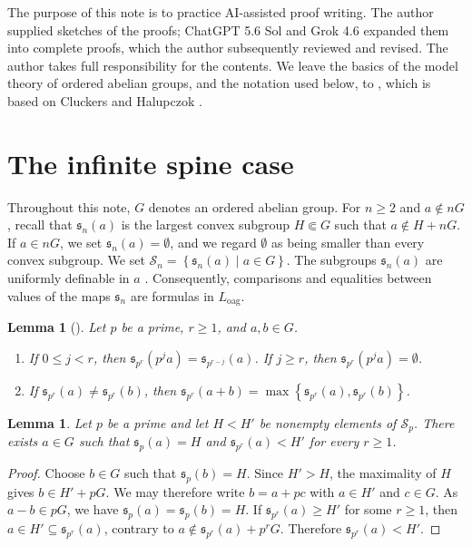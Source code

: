 \documentclass{article}
\theoremstyle{definition}
\theoremstyle{remark}
\theoremstyle{plain}
\newtheorem{lem}[dfn]{Lemma}
\begin{document}
The purpose of this note is to practice AI-assisted proof writing.
The author supplied sketches of the proofs; ChatGPT 5.6 Sol and Grok 4.6 expanded them into complete proofs, which the author subsequently reviewed and revised.
The author takes full responsibility for the contents.
We leave the basics of the model theory of ordered abelian groups, and the notation used below, to \cite[Section 2]{Okura2026DisOrd}, which is based on Cluckers and Halupczok \cite{Cluckers2011QuaEli}.

\section{The infinite spine case}

Throughout this note, $G$ denotes an ordered abelian group.
For $n \geq 2$ and $a \notin nG$, recall that $\mathfrak{s}_n(a)$ is the largest convex subgroup $H \Subset G$ such that $a \notin H + nG$.
If $a \in nG$, we set $\mathfrak{s}_n(a) = \emptyset$, and we regard $\emptyset$ as being smaller than every convex subgroup.
We set $\mathcal{S}_n = \left\{ \mathfrak{s}_n(a) \mid a \in G \right\}$.
The subgroups $\mathfrak{s}_n(a)$ are uniformly definable in $a$ \cite[Lemma 2.1]{Cluckers2011QuaEli}.
Consequently, comparisons and equalities between values of the maps $\mathfrak{s}_n$ are formulas in $L_{\mathrm{oag}}$.

\begin{lem}[{\cite[Lemma 2.8(2) and Remark 2.6]{Okura2026DisOrd}}]\label{lem:BasicPropertiesOfS}
	Let $p$ be a prime, $r \geq 1$, and $a,b \in G$.
	\begin{enumerate}
		\item If $0 \leq j < r$, then $\mathfrak{s}_{p^r}(p^j a) = \mathfrak{s}_{p^{r-j}}(a)$.
		If $j \geq r$, then $\mathfrak{s}_{p^r}(p^j a) = \emptyset$.
		\item If $\mathfrak{s}_{p^r}(a) \neq \mathfrak{s}_{p^r}(b)$, then $\mathfrak{s}_{p^r}(a+b) = \max \left\{ \mathfrak{s}_{p^r}(a),\mathfrak{s}_{p^r}(b) \right\}$.
	\end{enumerate}
\end{lem}

\begin{lem}\label{lem:RepresentativeBetweenSValues}
	Let $p$ be a prime and let $H<H'$ be nonempty elements of $\mathcal{S}_p$.
	There exists $a\in G$ such that $\mathfrak{s}_p(a)=H$ and $\mathfrak{s}_{p^r}(a)<H'$ for every $r\geq 1$.
\end{lem}

\begin{proof}
	Choose $b\in G$ such that $\mathfrak{s}_p(b)=H$.
	Since $H'>H$, the maximality of $H$ gives $b\in H'+pG$.
	We may therefore write $b=a+pc$ with $a\in H'$ and $c\in G$.
	As $a-b\in pG$, we have $\mathfrak{s}_p(a)=\mathfrak{s}_p(b)=H$.
	If $\mathfrak{s}_{p^r}(a) \geq H'$ for some $r \geq 1$, then $a\in H'\subseteq \mathfrak{s}_{p^r}(a)$, contrary to $a\notin \mathfrak{s}_{p^r}(a)+p^rG$.
	Therefore $\mathfrak{s}_{p^r}(a) < H'$.
\end{proof}
\end{document}
